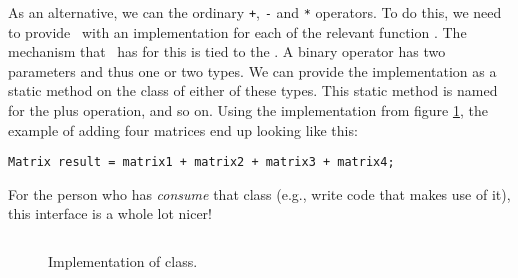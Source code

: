 As an alternative, we can  the ordinary \texttt{+}, \texttt{-} and \texttt{*} operators. To do this, we need to provide \csharp\ with an implementation for each of the relevant function . The mechanism that \csharp\ has for this is tied to the . A binary operator has two parameters and thus one or two types. We can provide the implementation as a static method on the class of either of these types. This static method is named  for the plus operation, and so on. Using the implementation from figure \ref{fig:objects:matrix:lib}, the example of adding four matrices end up looking like this:
\begin{verbatim}
Matrix result = matrix1 + matrix2 + matrix3 + matrix4;
\end{verbatim}
For the person who has \textsl{consume} that class (e.g., write code that makes use of it), this interface is a whole lot nicer!

\begin{figure}[tbp]
  \inputminted[fontsize=\footnotesize]{csharp}{../src/csharp/matrix/Matrix.cs}
  \caption{Implementation of  class.}
  \label{fig:objects:matrix:lib}
\end{figure}


